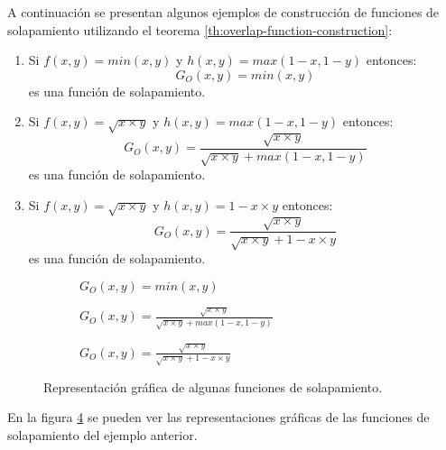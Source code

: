 \begin{example}
A continuación se presentan algunos ejemplos de construcción de funciones de solapamiento utilizando el teorema  \ref{th:overlap-function-construction}:
\begin{enumerate}[label=(\arabic*),ref=(\arabic*)]
	\item Si $f(x,y)=min(x,y)$ y $h(x,y) = max(1-x,1-y)$ entonces: 
	\begin{equation}
	G_{O}(x,y) = min(x,y)
	\end{equation} es una función de solapamiento.
	\item Si $f(x,y)=\sqrt{x \times y}$ y $h(x,y) = max(1-x,1-y)$ entonces: 
	\begin{equation}G_{O}(x,y) = \frac{\sqrt{x \times y}}{\sqrt{x \times y} + max(1-x,1-y)}
	\end{equation} es una función de solapamiento.
	\item Si $f(x,y)=\sqrt{x \times y}$ y $h(x,y) = 1 - x \times y $ entonces: 
	\begin{equation}G_{O}(x,y) = \frac{\sqrt{x \times y}}{\sqrt{x \times y} + 1 - x \times y}
	\end{equation} es una función de solapamiento.
\end{enumerate}
\end{example}
\begin{figure}[t]
	\centering
	\begin{subfigure}[b]{0.45\textwidth}
		\setlength\figureheight{4.5cm}
		\setlength\figurewidth{6cm}
		
		\caption{$G_{O}(x,y) = min(x,y)$}
		\label{fig:overlap-functions-min}
	\end{subfigure}
	\qquad
	\begin{subfigure}[b]{0.45\textwidth}
		\setlength\figureheight{4.5cm}
		\setlength\figurewidth{6cm}
		
		\caption{$G_{O}(x,y) = \frac{\sqrt{x \times y}}{\sqrt{x \times y} + max(1-x,1-y)}$}
		\label{fig:overlap-functions-sqrt-max}
	\end{subfigure}
	
	\vspace{1 cm}
	\begin{subfigure}[b]{0.45\textwidth}
		\setlength\figureheight{4.5cm}
		\setlength\figurewidth{6cm}
		
		\caption{$G_{O}(x,y) = \frac{\sqrt{x \times y}}{\sqrt{x \times y} + 1 - x \times y}$}
		\label{fig:overlap-functions-sqrt-2}
	\end{subfigure}
	\caption{Representación gráfica de algunas funciones de solapamiento.}
	\label{fig:overlap-functions-examples}
\end{figure}
En la figura \ref{fig:overlap-functions-examples} se pueden ver las representaciones gráficas de las funciones de solapamiento del ejemplo anterior.

